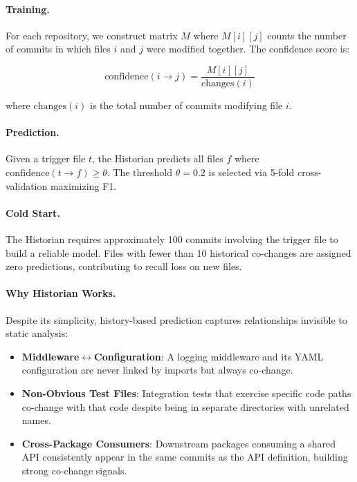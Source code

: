 \documentclass[sigconf,nonacm]{acmart}
\begin{document}
\paragraph{Training.} For each repository, we construct matrix $M$ where $M[i][j]$ counts the number of commits in which files $i$ and $j$ were modified together. The confidence score is:

\begin{equation}
\text{confidence}(i \to j) = \frac{M[i][j]}{\text{changes}(i)}
\end{equation}

where $\text{changes}(i)$ is the total number of commits modifying file $i$.

\paragraph{Prediction.} Given a trigger file $t$, the Historian predicts all files $f$ where $\text{confidence}(t \to f) \geq \theta$. The threshold $\theta = 0.2$ is selected via 5-fold cross-validation maximizing F1.

\paragraph{Cold Start.} The Historian requires approximately 100 commits involving the trigger file to build a reliable model. Files with fewer than 10 historical co-changes are assigned zero predictions, contributing to recall loss on new files.

\paragraph{Why Historian Works.} Despite its simplicity, history-based prediction captures relationships invisible to static analysis:
\begin{itemize}
    \item \textbf{Middleware$\leftrightarrow$Configuration}: A logging middleware and its YAML configuration are never linked by imports but always co-change.
    \item \textbf{Non-Obvious Test Files}: Integration tests that exercise specific code paths co-change with that code despite being in separate directories with unrelated names.
    \item \textbf{Cross-Package Consumers}: Downstream packages consuming a shared API consistently appear in the same commits as the API definition, building strong co-change signals.
\end{itemize}
\end{document}
